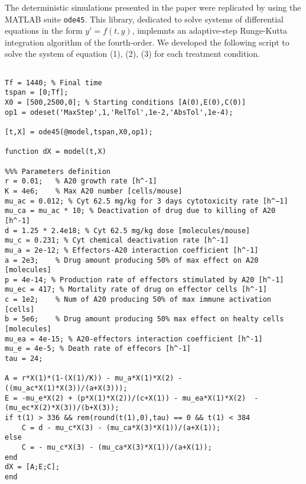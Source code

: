 The deterministic simulations presented in the paper were replicated by using the MATLAB suite \texttt{ode45}. This library, dedicated to solve systems of differential equations in the form $y'=f(t,y)$, implemnts an adaptive-step Runge-Kutta integration algorithm of the fourth-order. 
We developed the following script to solve the system of equation (1), (2), (3) for each treatment condition.

\begin{lstlisting}

Tf = 1440; % Final time
tspan = [0;Tf];
X0 = [500,2500,0]; % Starting conditions [A(0),E(0),C(0)]
op1 = odeset('MaxStep',1,'RelTol',1e-2,'AbsTol',1e-4);

[t,X] = ode45(@model,tspan,X0,op1);

function dX = model(t,X)

%%% Parameters definition
r = 0.01;   % A20 growth rate [h^-1]
K = 4e6;    % Max A20 number [cells/mouse]
mu_ac = 0.012; % Cyt 62.5 mg/kg for 3 days cytotoxicity rate [h^−1]
mu_ca = mu_ac * 10; % Deactivation of drug due to killing of A20 [h^-1]
d = 1.25 * 2.4e18; % Cyt 62.5 mg/kg dose [molecules/mouse]
mu_c = 0.231; % Cyt chemical deactivation rate [h^-1]
mu_a = 2e-12; % Effectors-A20 interaction coefficient [h^-1]
a = 2e3;    % Drug amount producing 50% of max effect on A20 [molecules]
p = 4e-14; % Production rate of effectors stimulated by A20 [h^-1]
mu_ec = 417; % Mortality rate of drug on effector cells [h^-1]
c = 1e2;    % Num of A20 producing 50% of max immune activation [cells]
b = 5e6;    % Drug amount producing 50% max effect on healty cells [molecules]
mu_ea = 4e-15; % A20-effectors interaction coefficient [h^-1]
mu_e = 4e-5; % Death rate of effecors [h^-1]
tau = 24;

A = r*X(1)*(1-(X(1)/K)) - mu_a*X(1)*X(2) - ((mu_ac*X(1)*X(3))/(a+X(3)));
E = -mu_e*X(2) + (p*X(1)*X(2))/(c+X(1)) - mu_ea*X(1)*X(2)  - (mu_ec*X(2)*X(3))/(b+X(3));
if t(1) > 336 && rem(round(t(1),0),tau) == 0 && t(1) < 384
    C = d - mu_c*X(3) - (mu_ca*X(3)*X(1))/(a+X(1)); 
else
    C = - mu_c*X(3) - (mu_ca*X(3)*X(1))/(a+X(1));
end
dX = [A;E;C];
end

\end{lstlisting}
